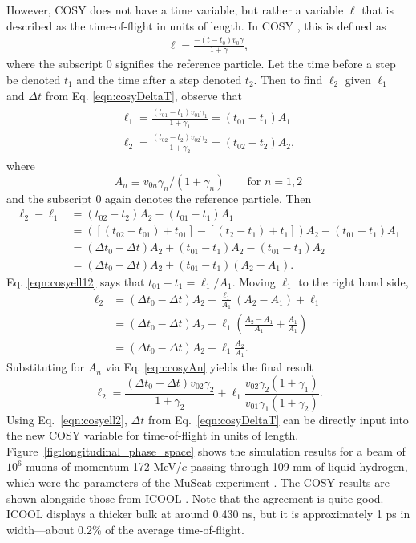 However, COSY does not have a time variable, but rather a variable $\ell$ that is described as the time-of-flight in units of length. In COSY \cite{cosy}, this is defined as
\begin{align*}
\ell=\frac{-(t-t_0)v_0\gamma}{1+\gamma},
\end{align*}
where the subscript $0$ signifies the reference particle. Let the time before a step be denoted $t_1$ and the time after a step denoted $t_2$. Then to find $\ell_2$ given $\ell_1$ and $\Delta t$ from Eq. \eqref{eqn:cosyDeltaT}, observe that
\begin{align} \label{eqn:cosyell12}
\begin{split}
\ell_1=\frac{(t_{01}-t_1)v_{01}\gamma_1}{1+\gamma_1} = (t_{01}-t_1)A_1\\
\ell_2=\frac{(t_{02}-t_2)v_{02}\gamma_2}{1+\gamma_2} = (t_{02}-t_2)A_2,
\end{split}
\end{align}
where 
\begin{equation}\label{eqn:cosyAn}
A_n \equiv v_{0n}\gamma_n / (1+\gamma_n) \qquad \text{for }n=1,2
\end{equation}
and the subscript $0$ again denotes the reference particle.
Then
\begin{align*}
\ell_2 - \ell_1 &=\left(t_{02}-t_2\right)A_2-(t_{01}-t_1)A_1\\
&=\left([(t_{02}-t_{01})+t_{01}]-[(t_2-t_1)+t_1]\right)A_2-(t_{01}-t_1)A_1\\
&=(\Delta t_0 - \Delta t )A_2 + (t_{01}-t_1)A_2-(t_{01}-t_1)A_2\\
&=(\Delta t_0 - \Delta t )A_2 + (t_{01}-t_1)(A_2-A_1).
\end{align*}
Eq. \eqref{eqn:cosyell12} says that $t_{01}-t_1=\ell_1/A_1$. Moving $\ell_1$ to the right hand side,
\begin{align*}
\ell_2 &= (\Delta t_0 - \Delta t)A_2 + \frac{\ell_1}{A_1}(A_2-A_1)+\ell_1\\
&=(\Delta t_0 - \Delta t)A_2 + \ell_1\left(\frac{A_2-A_1}{A_1}+\frac{A_1}{A_1}\right)\\
&=(\Delta t_0 - \Delta t)A_2 + \ell_1\frac{A_2}{A_1}.
\end{align*}
Substituting for $A_n$ via Eq. \eqref{eqn:cosyAn} yields the final result
\begin{equation}\label{eqn:cosyell2}
\ell_2=\frac{(\Delta t_0 - \Delta t) v_{02}\gamma_2}{1+\gamma_2}+\ell_1 \frac{v_{02}\gamma_2 (1+\gamma_1)}{v_{01}\gamma_1 (1+\gamma_2)}.
\end{equation}
Using Eq.~\eqref{eqn:cosyell2}, $\Delta t$ from Eq.~\eqref{eqn:cosyDeltaT} can be directly input into the new COSY variable for time-of-flight in units of length. Figure~\ref{fig:longitudinal_phase_space} shows the simulation results for a beam of $10^6$ muons of momentum 172 MeV/$c$ passing through 109 mm of liquid hydrogen, which were the parameters of the MuScat experiment \cite{muscat}. The COSY results are shown alongside those from ICOOL \cite{icool}. Note that the agreement is quite good. ICOOL displays a thicker bulk at around 0.430 ns, but it is approximately 1 ps in width---about 0.2\% of the average time-of-flight.


